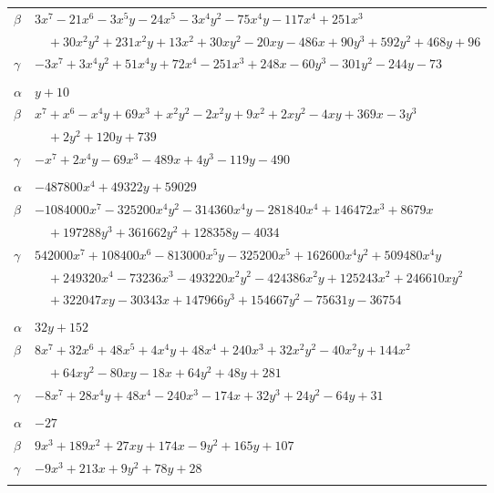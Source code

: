 \documentclass[11pt]{article}
\begin{document}
\begin{longtable}{@{}ll@{}}
$\beta$ & $3x^{7}-21x^{6}-3x^{5}y-24x^{5}-3x^{4}y^{2}-75x^{4}y-117x^{4}+251x^{3}$\\
 & $\quad +30x^{2}y^{2}+231x^{2}y+13x^{2}+30xy^{2}-20xy-486x+90y^{3}+592y^{2}+468y+96$\\
$\gamma$ & $-3x^{7}+3x^{4}y^{2}+51x^{4}y+72x^{4}-251x^{3}+248x-60y^{3}-301y^{2}-244y-73$\\
\addlinespace[3pt]
\multicolumn{2}{@{}l}{$\{i,j\}=\{32,46\}$, $k_{ij}=2\cdot 3^{2}\cdot 5\cdot 11$}\\
$\alpha$ & $y+10$\\
$\beta$ & $x^{7}+x^{6}-x^{4}y+69x^{3}+x^{2}y^{2}-2x^{2}y+9x^{2}+2xy^{2}-4xy+369x-3y^{3}$\\
 & $\quad +2y^{2}+120y+739$\\
$\gamma$ & $-x^{7}+2x^{4}y-69x^{3}-489x+4y^{3}-119y-490$\\
\addlinespace[3pt]
\multicolumn{2}{@{}l}{$\{i,j\}=\{32,57\}$, $k_{ij}=3^{4}\cdot 5^{2}\cdot 11$}\\
$\alpha$ & $-487800x^{4}+49322y+59029$\\
$\beta$ & $-1084000x^{7}-325200x^{4}y^{2}-314360x^{4}y-281840x^{4}+146472x^{3}+8679x$\\
 & $\quad +197288y^{3}+361662y^{2}+128358y-4034$\\
$\gamma$ & $542000x^{7}+108400x^{6}-813000x^{5}y-325200x^{5}+162600x^{4}y^{2}+509480x^{4}y$\\
 & $\quad +249320x^{4}-73236x^{3}-493220x^{2}y^{2}-424386x^{2}y+125243x^{2}+246610xy^{2}$\\
 & $\quad +322047xy-30343x+147966y^{3}+154667y^{2}-75631y-36754$\\
\addlinespace[3pt]
\multicolumn{2}{@{}l}{$\{i,j\}=\{32,64\}$, $k_{ij}=2\cdot 3^{2}\cdot 5$}\\
$\alpha$ & $32y+152$\\
$\beta$ & $8x^{7}+32x^{6}+48x^{5}+4x^{4}y+48x^{4}+240x^{3}+32x^{2}y^{2}-40x^{2}y+144x^{2}$\\
 & $\quad +64xy^{2}-80xy-18x+64y^{2}+48y+281$\\
$\gamma$ & $-8x^{7}+28x^{4}y+48x^{4}-240x^{3}-174x+32y^{3}+24y^{2}-64y+31$\\
\addlinespace[3pt]
\multicolumn{2}{@{}l}{$\{i,j\}=\{32,91\}$, $k_{ij}=1$}\\
$\alpha$ & $-27$\\
$\beta$ & $9x^{3}+189x^{2}+27xy+174x-9y^{2}+165y+107$\\
$\gamma$ & $-9x^{3}+213x+9y^{2}+78y+28$\\
\addlinespace[3pt]

\end{longtable}
\end{document}
